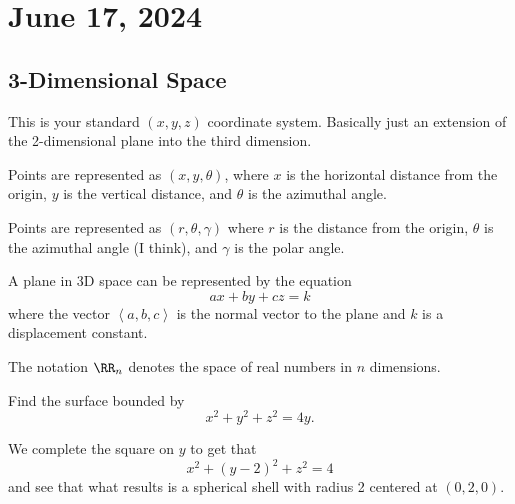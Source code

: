 \chapter{June 17, 2024}

\section{3-Dimensional Space}

\begin{definition}
    This is your standard $(x, y, z)$ coordinate system. Basically just an extension of the 2-dimensional plane into the third dimension.
\end{definition}

\begin{definition}
    Points are represented as $(x, y, \theta)$, where $x$ is the horizontal distance from the origin, $y$ is the vertical distance, and $\theta$ is the azimuthal angle.
\end{definition}

\begin{definition}
    Points are represented as $(r, \theta, \gamma)$ where $r$ is the distance from the origin, $\theta$ is the azimuthal angle (I think), and $\gamma$ is the polar angle.
\end{definition}

\begin{definition}
    A plane in 3D space can be represented by the equation
    \[ax + by + cz = k\]
    where the vector $\left<a, b, c\right>$ is the normal vector to the plane and $k$ is a displacement constant.
\end{definition}

\begin{definition}
    The notation $\RR_{n}$ denotes the space of real numbers in $n$ dimensions.
\end{definition}

\begin{example}
    Find the surface bounded by
    \[x^{2} + y^{2} + z^{2} = 4y.\]

    \begin{soln}
        We complete the square on $y$ to get that
        \[x^{2} + (y - 2)^{2} + z^{2} = 4\]
        and see that what results is a spherical shell with radius 2 centered at $(0, 2, 0)$.
    \end{soln}
\end{example}

